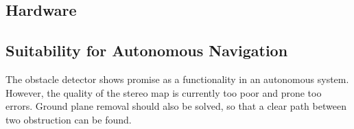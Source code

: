 \subsection{Hardware}




\subsection{Suitability for Autonomous Navigation}

The obstacle detector shows promise as a functionality in an autonomous system. However, the quality of the stereo map is currently too poor and prone too errors. Ground plane removal should also be solved, so that a clear path between two obstruction can be found. 